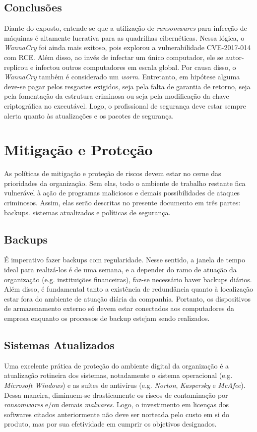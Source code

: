 \documentclass[12pt]{article}
\begin{document}
\subsection{Conclusões}
Diante do exposto, entende-se que a utilização de \textit{ransomwares} para infecção de máquinas é altamente lucrativa para as quadrilhas cibernéticas. Nessa lógica, o \textit{WannaCry} foi ainda mais exitoso, pois explorou a vulnerabilidade CVE-2017-014 com RCE. Além disso, ao invés de infectar um único computador, ele se autor-replicou e infectou outros computadores em escala global. Por causa disso, o \textit{WannaCry} também é considerado um \textit{worm}. Entretanto, em hipótese alguma deve-se pagar pelos resgastes exigidos, seja pela falta de garantia de retorno, seja pela fomentação da estrutura criminosa ou seja pela modificação da chave criptográfica no executável. Logo, o profissional de segurança deve estar sempre alerta quanto às atualizações e os pacotes de segurança.





\section{Mitigação e Proteção}
As políticas de mitigação e proteção de riscos devem estar no cerne das prioridades da organização. Sem elas, todo o ambiente de trabalho restante fica vulnerável à ação de programas maliciosos e demais possibilidades de ataques criminosos. Assim, elas serão descritas no presente documento em três partes: backups. sistemas atualizados e políticas de segurança.

\subsection{Backups}
É imperativo fazer backups com regularidade. Nesse sentido, a janela de tempo ideal para
realizá-los é de uma semana, e a depender do ramo de atuação da organização (e.g. instituições financeiras), faz-se necessário haver backups diários. Além disso, é fundamental tanto a existência
de redundância quanto à localização estar fora do ambiente de atuação diária da companhia. Portanto,
os dispositivos de armazenamento externo só devem estar conectados aos computadores da empresa enquanto os processos de backup estejam sendo realizados.

\subsection{Sistemas Atualizados}
Uma excelente prática de proteção do ambiente digital da organização é a atualização rotineira dos sistemas, notadamente o sistema operacional (e.g. \textit{Microsoft Windows}) e as suítes de antivírus (e.g. \textit{Norton}, \textit{Kaspersky} e \textit{McAfee}). Dessa maneira, diminuem-se drasticamente os riscos de contaminação por \textit{ransomwares} e/ou demais \textit{malwares}. Logo, o investimento em licenças dos softwares citados anteriormente não deve ser norteada pelo custo em si do produto, mas por sua efetividade em cumprir os objetivos designados.
\end{document}
